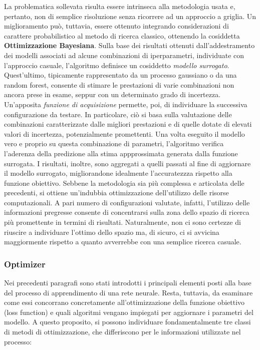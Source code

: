 La problematica sollevata risulta essere intrinseca alla metodologia usata e, pertanto, non di semplice risoluzione senza ricorrere ad un approccio a griglia. Un miglioramento può, tuttavia, essere ottenuto integrando considerazioni di carattere probabilistico al metodo di ricerca classico, ottenendo la cosiddetta \textbf{Ottimizzazione Bayesiana}. Sulla base dei risultati ottenuti dall'addestramento dei modelli associati ad alcune combinazioni di iperparametri, individuate con l'approccio casuale, l'algoritmo definisce un cosiddetto \emph{modello surrogato}. Quest'ultimo, tipicamente rappresentato da un processo gaussiano o da una random forest, consente di stimare le prestazioni di varie combinazioni non ancora prese in esame, seppur con un determinato grado di incertezza. Un'apposita \emph{funzione di acquisizione} permette, poi, di individuare la successiva configurazione da testare. In particolare, ciò si basa sulla valutazione delle combinazioni caratterizzate dalle migliori prestazioni e di quelle dotate di elevati valori di incertezza, potenzialmente promettenti. Una volta eseguito il modello vero e proprio su questa combinazione di parametri, l'algoritmo verifica l'aderenza della predizione alla stima appprossimata generata dalla funzione surrogata. I risultati, inoltre, sono aggregati a quelli passati al fine di aggiornare il modello surrogato, migliorandone idealmente l'accuratezzza rispetto alla funzione obiettivo. Sebbene la metodologia sia più complessa e articolata delle precedenti, si ottiene un'indubbia ottimizzazione dell'utilizzo delle risorse computazionali. A pari numero di configurazioni valutate, infatti, l'utilizzo delle informazioni pregresse consente di concentrarsi sulla zona dello spazio di ricerca più promettente in termini di risultati. Naturalmente, non ci sono certezze di riuscire a individuare l'ottimo dello spazio ma, di sicuro, ci si avvicina maggiormente rispetto a quanto avverrebbe con una semplice ricerca casuale. 


\subsubsection{Optimizer}

Nei precedenti paragrafi sono stati introdotti i principali elementi posti alla base del processo di apprendimento di una rete neurale. Resta, tuttavia, da esaminare come essi concorrano concretamente all'ottimizzazione della funzione obiettivo (loss function) e quali algoritmi vengano impiegati per aggiornare i parametri del modello. A questo proposito, si possono individuare fondamentalmente tre classi di metodi di ottimizzazione, che differiscono per le informazioni utilizzate nel processo:


